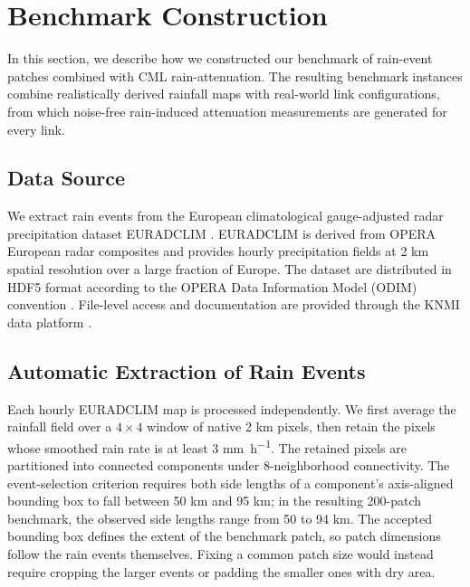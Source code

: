 \documentclass[a4paper,fleqn]{cas-sc}
\newcommand{\notebox}[3]{%
  \begingroup
  \setlength{\fboxsep}{2pt}%
  \fcolorbox{#1}{#2}{\textsf{\footnotesize #3}}%
  \endgroup
}
\DeclareRobustCommand{\editnote}[1]{%
  \texorpdfstring{%
    \nobreak\hfill
    \mbox{\notebox{red!50!black}{red!10}{#1}}%
  }{}%
}
\begin{document}
\section{Benchmark Construction\editnote{GE:stable}}
In this section, we describe how we constructed our benchmark of rain-event patches combined with CML rain-attenuation.  The resulting benchmark instances combine realistically derived rainfall maps with real-world link configurations, from which noise-free rain-induced attenuation measurements are generated for every link.
\subsection{Data Source}
We extract rain events from the European climatological gauge-adjusted radar precipitation dataset EURADCLIM \citep{overeem2023euradclim}. EURADCLIM is derived from OPERA European radar composites and provides hourly precipitation fields at 2 \si{\kilo\meter} spatial resolution over a large fraction of Europe. The dataset are distributed in HDF5 format according to the OPERA Data Information Model (ODIM) convention \citep{odimh5}. File-level access and documentation are provided through the KNMI data platform \citep{knmi_euradclim_project}.

\subsection{Automatic Extraction of Rain Events}
Each hourly EURADCLIM map is processed independently. We first average the rainfall field over a $4 \times 4$ window of native 2 \si{\kilo\meter} pixels, then retain the pixels whose smoothed rain rate is at least 3 \si{\milli\meter\per\hour}. The retained pixels are partitioned into connected components under $8$-neighborhood connectivity. The event-selection criterion requires both side lengths of a component's axis-aligned bounding box to fall between 50 \si{\kilo\meter} and 95 \si{\kilo\meter}; in the resulting 200-patch benchmark, the observed side lengths range from 50 to 94 \si{\kilo\meter}. The accepted bounding box defines the extent of the benchmark patch, so patch dimensions follow the rain events themselves. Fixing a common patch size would instead require cropping the larger events or padding the smaller ones with dry area.


\end{document}
